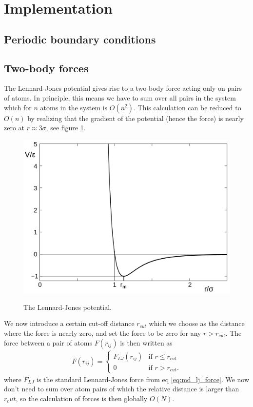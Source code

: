 \section{Implementation}
\subsection{Periodic boundary conditions}

\subsection{Two-body forces}
\label{sec:md_implementation_two_body_forces}
The Lennard-Jones potential gives rise to a two-body force acting only on pairs of atoms. In principle, this means we have to sum over all pairs in the system which for $n$ atoms in the system is $O(n^2)$. This calculation can be reduced to $O(n)$ by realizing that the gradient of the potential (hence the force) is nearly zero at $r \approx 3\sigma$, see figure \ref{fig:md_lennard_jones_2}. 
\begin{figure}[h]
\begin{center}
\includegraphics[width=1.0\textwidth, trim=0cm 0cm 0cm 0cm, clip]{MD/figures/lennard_jones.png}
\label{fig:md_lennard_jones_2}
\end{center}
\caption{The Lennard-Jones potential. }
\end{figure}
We now introduce a certain cut-off distance $r_{cut}$ which we choose as the distance where the force is nearly zero, and set the force to be zero for any $r>r_{cut}$. The force between a pair of atoms $F(r_{ij})$ is then written as
\begin{align}
	F(r_{ij}) = \left\{\begin{array}{cc}
		F_{LJ}(r_{ij}) & \text{if } r \leq r_{cut}\\
		0 & \text{if } r > r_{cut}.
	\end{array}
	\right.
\end{align}
where $F_{LJ}$ is the standard Lennard-Jones force from eq \eqref{eq:md_lj_force}. We now don't need to sum over atom pairs of which the relative distance is larger than $r_cut$, so the calculation of forces is then globally $O(N)$. 